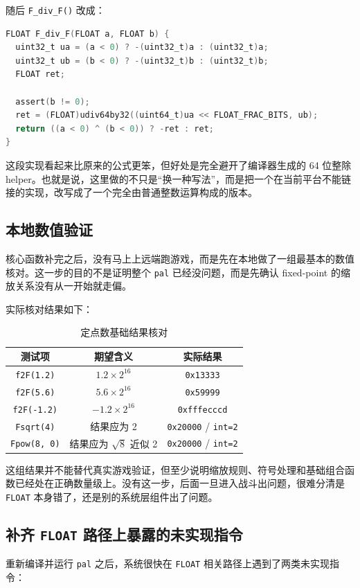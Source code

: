 \documentclass[a4paper]{article}
\begin{document}
随后 \texttt{F\_div\_F()} 改成：

\begin{lstlisting}[language=C]
FLOAT F_div_F(FLOAT a, FLOAT b) {
  uint32_t ua = (a < 0) ? -(uint32_t)a : (uint32_t)a;
  uint32_t ub = (b < 0) ? -(uint32_t)b : (uint32_t)b;
  FLOAT ret;

  assert(b != 0);
  ret = (FLOAT)udiv64by32((uint64_t)ua << FLOAT_FRAC_BITS, ub);
  return ((a < 0) ^ (b < 0)) ? -ret : ret;
}
\end{lstlisting}

这段实现看起来比原来的公式更笨，但好处是完全避开了编译器生成的 64 位整除 helper。也就是说，这里做的不只是“换一种写法”，而是把一个在当前平台不能链接的实现，改写成了一个完全由普通整数运算构成的版本。

\subsection{本地数值验证}
核心函数补完之后，没有马上上远端跑游戏，而是先在本地做了一组最基本的数值核对。这一步的目的不是证明整个 \texttt{pal} 已经没问题，而是先确认 fixed-point 的缩放关系没有从一开始就走偏。

实际核对结果如下：

\begin{table}[H]
  \centering
  \begin{tabular}{ccc}
    \toprule
    测试项 & 期望含义 & 实际结果 \\
    \midrule
    \texttt{f2F(1.2)} & $1.2 \times 2^{16}$ & \texttt{0x13333} \\
    \texttt{f2F(5.6)} & $5.6 \times 2^{16}$ & \texttt{0x59999} \\
    \texttt{f2F(-1.2)} & $-1.2 \times 2^{16}$ & \texttt{0xfffecccd} \\
    \texttt{Fsqrt(4)} & 结果应为 2 & \texttt{0x20000} / \texttt{int=2} \\
    \texttt{Fpow(8, 0)} & 结果应为 $\sqrt{8}$ 近似 2 & \texttt{0x20000} / \texttt{int=2} \\
    \bottomrule
  \end{tabular}
  \caption{定点数基础结果核对}
\end{table}

这组结果并不能替代真实游戏验证，但至少说明缩放规则、符号处理和基础组合函数已经处在正确数量级上。没有这一步，后面一旦进入战斗出问题，很难分清是 \texttt{FLOAT} 本身错了，还是别的系统层组件出了问题。

\subsection{补齐 \texttt{FLOAT} 路径上暴露的未实现指令}
重新编译并运行 \texttt{pal} 之后，系统很快在 \texttt{FLOAT} 相关路径上遇到了两类未实现指令：
\end{document}
